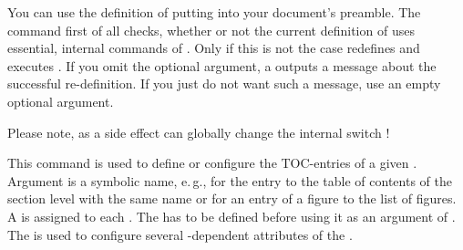 You can use the definition of  putting
 into your document's preamble. The command first
of all checks, whether or not the current definition of 
uses essential, internal commands of . Only if this is not
the case  redefines  and
executes . If you omit the optional argument, a
 outputs a message about the successful re-definition. If
you just do not want such a message, use an empty optional argument.

Please note, as a side effect
 can globally change the internal switch
!%
\EndIndexGroup


\begin{Declaration}
\end{Declaration}
This command is used to define
or configure the TOC-entries of a given . Argument
 is a symbolic name, e.\,g.,  for the entry
to the table of contents of the section level with the same name or
 for an entry of a figure to the list of figures. A
 is assigned to each . The  has
to be defined before using it as an argument of
. The  is used to configure
several -dependent attributes of the .

